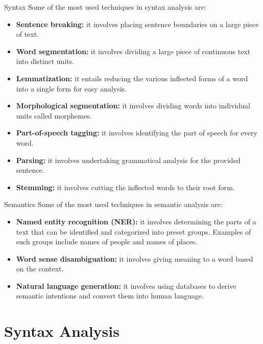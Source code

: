 \begin{frame}[containsverbatim]{Syntax}
    Some of the most used techniques in syntax analysis are:
    \begin{itemize}
        \item \textbf{Sentence breaking:} it involves placing sentence boundaries on a large piece of text.
        \item \textbf{Word segmentation:} it involves dividing a large piece of continuous text into distinct units.
        \item \textbf{Lemmatization:} it entails reducing the various inflected forms of a word into a single form for easy analysis.
        \item \textbf{Morphological segmentation:} it involves dividing words into individual units called morphemes.
        \item \textbf{Part-of-speech tagging:} it involves identifying the part of speech for every word.
        \item \textbf{Parsing:} it involves undertaking grammatical analysis for the provided sentence.
        \item \textbf{Stemming:} it involves cutting the inflected words to their root form.
    \end{itemize}
\end{frame}

\begin{frame}[containsverbatim]{Semantics}
    Some of the most used techniques in semantic analysis are:
    \begin{itemize}
        \item \textbf{Named entity recognition (NER):} it involves determining the parts of a text that can be identified and categorized into preset groups. Examples of such groups include names of people and names of places.
        \item \textbf{Word sense disambiguation:} it involves giving meaning to a word based on the context.
        \item \textbf{Natural language generation:} it involves using databases to derive semantic intentions and convert them into human language.
    \end{itemize}
\end{frame}



\section{Syntax Analysis}

